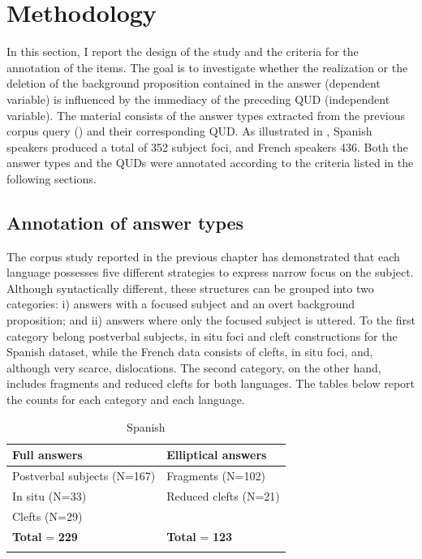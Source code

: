 \section{Methodology} \label{sub:5.2}
In this section, I report the design of the study and the criteria for the annotation of the items. The goal is to investigate whether the realization or the deletion of the background proposition contained in the answer (dependent variable) is influenced by the immediacy of the preceding QUD (independent variable). The material consists of the answer types extracted  from the previous corpus query () and their corresponding QUD. As illustrated in , Spanish speakers produced a total of 352 subject foci, and French speakers 436. 
Both the answer types and the QUDs were annotated according to the criteria listed in the following sections.

\subsection{Annotation of answer types} \label{sub:5.2.1}
\largerpage
The corpus study reported in the previous chapter has demonstrated that each language possesses five different strategies to express narrow focus on the subject. Although syntactically different, these structures can be grouped into two categories: i) answers with a focused subject and an overt background proposition; and ii) answers where only the focused subject is uttered. To the first category belong postverbal subjects, in situ foci and cleft constructions for the Spanish dataset, while the French data consists of clefts, in situ foci, and, although very scarce, dislocations.
The second category, on the other hand, includes fragments and reduced clefts for both languages. The tables below report the counts for each category and each language.

\begin{table}
\caption{Spanish}
\begin{tabularx}{0.8\textwidth}{Q >{\arraybackslash}X}
\lsptoprule
\textbf{Full answers} & \textbf{Elliptical answers} \\
\midrule
Postverbal subjects (N=167) & Fragments (N=102) \\
In situ (N=33) & Reduced clefts (N=21) \\
Clefts (N=29) & \\
\midrule
\textbf{Total} = \textbf{229} & \textbf{Total} = \textbf{123} \\
\lspbottomrule
\end{tabularx}
\end{table}

